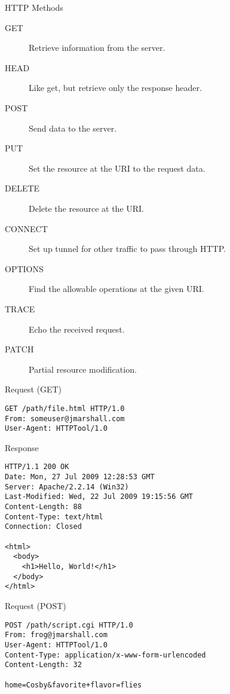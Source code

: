\begin{frame}{HTTP Methods}
  \begin{description}
    \item[GET] Retrieve information from the server.
    \item[HEAD] Like get, but retrieve only the response header.
    \item[POST] Send data to the server.
    \item[PUT] Set the resource at the URI to the request data.
    \item[DELETE] Delete the resource at the URI.
    \item[CONNECT] Set up tunnel for other traffic to pass through HTTP.
    \item[OPTIONS] Find the allowable operations at the given URI.
    \item[TRACE] Echo the received request.
    \item[PATCH] Partial resource modification.
  \end{description}
\end{frame}


\begin{frame}[fragile]{Request (GET)}
  \begin{verbatim}
GET /path/file.html HTTP/1.0
From: someuser@jmarshall.com
User-Agent: HTTPTool/1.0
  \end{verbatim}
\end{frame}

\begin{frame}[fragile]{Response}
  \begin{verbatim}
HTTP/1.1 200 OK
Date: Mon, 27 Jul 2009 12:28:53 GMT
Server: Apache/2.2.14 (Win32)
Last-Modified: Wed, 22 Jul 2009 19:15:56 GMT
Content-Length: 88
Content-Type: text/html
Connection: Closed

<html>
  <body>
    <h1>Hello, World!</h1>
  </body>
</html>
  \end{verbatim}
\end{frame}


\begin{frame}[fragile]{Request (POST)}
  \begin{verbatim}
POST /path/script.cgi HTTP/1.0
From: frog@jmarshall.com
User-Agent: HTTPTool/1.0
Content-Type: application/x-www-form-urlencoded
Content-Length: 32

home=Cosby&favorite+flavor=flies
  \end{verbatim}
\end{frame}

